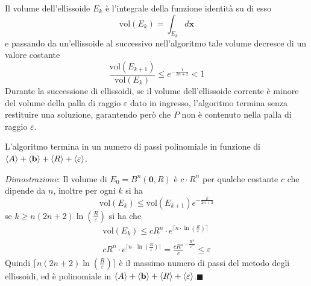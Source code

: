 \documentclass[10pt, letterpaper]{report}
\newcommand{\bb}{{\mathbf{b}}}
\newcommand{\x}{{\mathbf{x}}}
\begin{document}
Il volume dell'ellissoide $E_k$ è l'integrale della funzione identità su di esso 
$$ \text{vol}(E_k)=\int_{E_k}d\x$$
e passando da un'ellissoide al successivo nell'algoritmo tale volume decresce di un valore costante 
$$ 
\frac{\text{vol}(E_{k+1})}{\text{vol}(E_{k})}\le e^{-\frac{1}{2n+2}}<1
$$
Durante la successione di ellissoidi, se il volume dell'ellissoide corrente è minore del volume della palla di raggio $\varepsilon$ dato in ingresso, l'algoritmo termina senza restituire una soluzione, garantendo però che $P$ non è contenuto nella palla di raggio $\varepsilon$.
\begin{proposizione}
    L'algoritmo termina in un numero di passi polinomiale in funzione di $\bra A+\bra \bb+\bra R+\bra \varepsilon$.
\end{proposizione}
\textit{Dimostrazione}:  Il volume di $E_0=B^n(\mathbf 0,R)$ è $c\cdot R^n$ per qualche costante $c$ che dipende da $n$, inoltre per ogni $k$ si ha 
$$ \text{vol}(E_k)\le \text{vol}(E_{k+1})e^{-\frac{k}{2n+2}}$$
se $k\ge n(2n+2)\ln(\frac{R}{\varepsilon})$ si ha che 
\begin{eqnarray}
    \text{vol}(E_k)\le cR^n\cdot e^{\lceil n\cdot\ln(\frac{R}{\varepsilon}) \rceil}\\ 
    cR^n\cdot e^{\lceil n\cdot\ln(\frac{R}{\varepsilon}) \rceil}=\frac{cR^n}e^{-\frac{R^n}{\varepsilon^n}}\le \varepsilon
\end{eqnarray}
Quindi $\lceil n(2n+2)\ln(\frac{R}{\varepsilon})\rceil$ è il massimo numero di passi del metodo degli ellissoidi, ed è polinomiale in $\bra A+\bra \bb+\bra R+\bra \varepsilon$.\hfill$\blacksquare$
\end{document}
